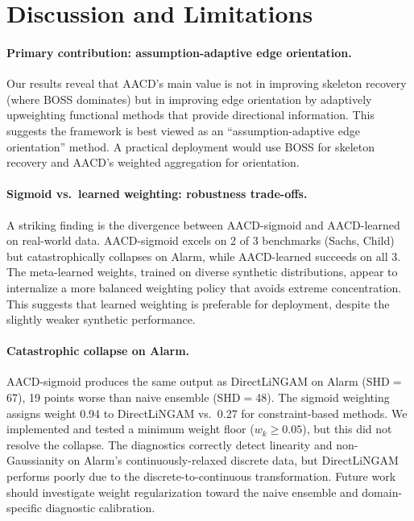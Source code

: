 \documentclass{article}
\newcommand{\aacd}{\textsc{AACD}}
\begin{document}
\section{Discussion and Limitations}
\label{sec:discussion}

\paragraph{Primary contribution: assumption-adaptive edge orientation.} Our results reveal that \aacd{}'s main value is not in improving skeleton recovery (where BOSS dominates) but in improving edge orientation by adaptively upweighting functional methods that provide directional information. This suggests the framework is best viewed as an ``assumption-adaptive edge orientation'' method. A practical deployment would use BOSS for skeleton recovery and \aacd{}'s weighted aggregation for orientation.

\paragraph{Sigmoid vs.\ learned weighting: robustness trade-offs.} A striking finding is the divergence between \aacd{}-sigmoid and \aacd{}-learned on real-world data. \aacd{}-sigmoid excels on 2 of 3 benchmarks (Sachs, Child) but catastrophically collapses on Alarm, while \aacd{}-learned succeeds on all 3. The meta-learned weights, trained on diverse synthetic distributions, appear to internalize a more balanced weighting policy that avoids extreme concentration. This suggests that learned weighting is preferable for deployment, despite the slightly weaker synthetic performance.

\paragraph{Catastrophic collapse on Alarm.} \aacd{}-sigmoid produces the same output as DirectLiNGAM on Alarm (SHD$=$67), 19 points worse than naive ensemble (SHD$=$48). The sigmoid weighting assigns weight 0.94 to DirectLiNGAM vs.\ 0.27 for constraint-based methods. We implemented and tested a minimum weight floor ($w_k \geq 0.05$), but this did not resolve the collapse. The diagnostics correctly detect linearity and non-Gaussianity on Alarm's continuously-relaxed discrete data, but DirectLiNGAM performs poorly due to the discrete-to-continuous transformation. Future work should investigate weight regularization toward the naive ensemble and domain-specific diagnostic calibration.
\end{document}

